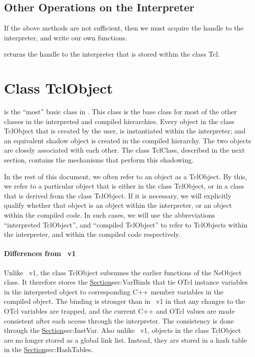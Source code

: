 \documentclass{article}
\begin{document}
\subsection{Other Operations on the Interpreter}
\label{sec:other}

If the above methods are not sufficient,
then we must acquire the handle to the interpreter,
and write our own functions.
\begin{list}{\textbullet}{}
\item {}
        returns the handle to the interpreter that is stored
        within the class Tcl.
\end{list}

\section{Class TclObject}
\label{sec:TclObject}

 is the ``most'' basic class in \ns.
This class is the base class for most of the other classes
in the interpreted and compiled hierarchies.
Every object  in the class TclObject that is created by the user,
is instantiated within the interpreter;
and an equivalent shadow object is created in the compiled hierarchy.
The two objects are closely associated with each other.
The class TclClass, described in the next section,
contains the mechanisms that perform this shadowing.

In the rest of this document, we often refer to an object as a TclObject.
By this, we refer to a particular object that is either in the class
TclObject, or in a class that is derived from the class TclObject.
If it is necessary, we will explicitly qualify whether that object is
an object within the interpreter, or an object within the compiled code.
In such cases,
we will use the abbreviations ``interpreted TclObject'', and
``compiled TclObject'' to refer to TclObjects within the interpreter, 
and within the compiled code respectively.

\paragraph{Differences from \ns~v1}
Unlike \ns~v1, the class TclObject
subsumes the earlier functions of the NsObject class.
It therefore stores the
\href{interface variable bindings}{Section}{sec:VarBinds}
that tie OTcl instance variables in the interpreted object
to corresponding C++ member variables in the compiled object.
The binding is stronger than in \ns~v1 in that
any changes to the OTcl variables are trapped,
and the current C++ and OTcl values
are made consistent after each access through the interpreter.
The consistency is done through the
\href{class InstVar}{Section}{sec:InstVar}.
Also unlike \ns~v1, objects in the class TclObject
are no longer stored as a global link list.
Instead, they are stored in a hash table in the
\href{class Tcl}{Section}{sec:HashTables}.
\end{document}
